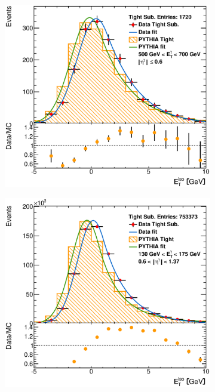 \documentclass[12pt, twoside]{article}
\numberwithin{equation}{section}
\numberwithin{figure}{section}
\newenvironment{changemargin}[2]{%
\begin{list}{}{%
\setlength{\topsep}{0pt}%
\setlength{\leftmargin}{#1}%
\setlength{\rightmargin}{#2}%
\setlength{\listparindent}{\parindent}%
\setlength{\itemindent}{\parindent}%
\setlength{\parsep}{\parskip}%
}%
\item[]}{\end{list}}
\begin{document}
\begin{figure}[H]
\begin{changemargin}{-1.0cm}{-0.75cm}
\begin{changemargin}{-0.75cm}{-1.0cm}
        \begin{subfigure}[b]{0.27\textwidth}
            \includegraphics[width=\textwidth]{./images/EtISOCorrection/T_MC_FITS-15(10GeV)(Before).eps}
        \end{subfigure}
        \begin{subfigure}[b]{0.27\textwidth}
            \includegraphics[width=\textwidth]{./images/EtISOCorrection/T_MC_FITS-21(10GeV)(Before).eps}

\end{subfigure}
\end{changemargin}
\end{changemargin}
\end{figure}
\end{document}
